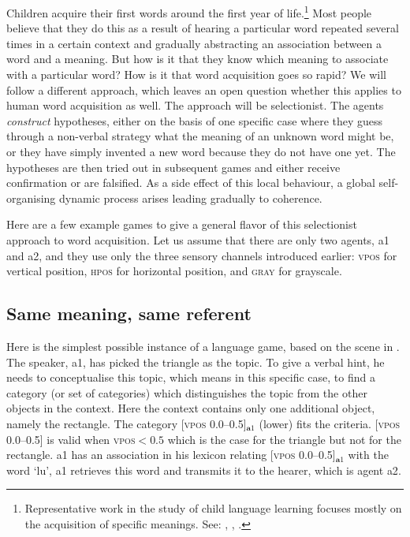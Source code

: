 Children acquire their first words around the first year
of life.\footnote{
Representative work in the study of child language
learning focuses mostly on the acquisition of specific meanings.
See: \cite{Gleitman:1994}, 
\cite{Clark:1993}, \cite{Bowerman:1996}.}
Most people believe that they do this 
as a result of hearing a particular word repeated several times in a
certain context and gradually abstracting an
association between a word and a meaning. But 
how is it that they know which meaning to associate with a 
particular word? How is it that word acquisition goes
so rapid? We will follow a different 
approach, which leaves an open question whether
this applies to human word acquisition as well. The
approach will be selectionist. The agents {\itshape construct} 
hypotheses, either on the basis of one specific case 
where they guess through a non-verbal strategy what 
the meaning of an unknown word might be, 
or they have simply invented a new word because
they do not have one yet. The hypotheses are 
then tried out in subsequent games and either receive confirmation
or are falsified. As a side effect of this local behaviour, 
a global self-organising dynamic process arises leading gradually to coherence. 

Here are a few example games to give a general 
flavor of this selectionist approach to word acquisition. 
Let us assume that there are only two 
agents, {\bfshape a1} and {\bfshape a2}, and they use only the 
three sensory channels introduced earlier: \textsc{vpos} for 
vertical position, \textsc{hpos} for horizontal position, and \textsc{gray}
for grayscale. 

\subsection{Same meaning, same referent}

Here is the simplest possible instance of a
language game, based on the scene in . 
The speaker, {\bfshape a1}, has picked the triangle as the topic.
To give a verbal hint, he needs 
to conceptualise this topic, which means in this 
specific case, to find a 
category (or set of categories) which distinguishes the 
topic from the other objects in the context. Here 
the context contains only one additional 
object, namely the rectangle. The category
[\textsc{vpos} 0.0–0.5]$_{\mathbf a1}$ (lower) fits the criteria. 
[\textsc{vpos} 0.0–0.5] is valid when \textsc{vpos}$ < 0.5$
which is the case for the triangle but not for the rectangle. 
{\bfshape a1} has an association in his lexicon 
relating [\textsc{vpos} 0.0–0.5]$_{\mathbf  a1}$ with the word `lu', 
{\bfshape a1} retrieves this word and transmits it to 
the hearer, which is agent {\bfshape a2}. 


